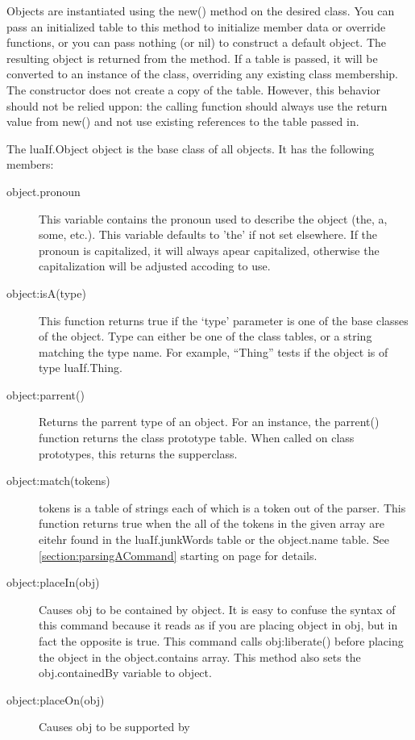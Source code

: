 \documentclass{book}
\begin{document}
Objects are instantiated using the new() method on the desired
class. You can pass an initialized table to this method to initialize
member data or override functions, or you can pass nothing (or nil) to
construct a default object. The resulting object is returned from the
method. If a table is passed, it will be converted to an instance of
the class, overriding any existing class membership. The constructor
does not create a copy of the table. However, this behavior should not
be relied uppon: the calling function should always use the return
value from new() and not use existing references to the table passed
in.

The luaIf.Object object is the base class of all objects. It has the
following members:

\begin{description}
\item[object.pronoun] This variable contains the pronoun used to
  describe the object (the, a, some, etc.). This variable defaults to
  'the' if not set elsewhere. If the pronoun is capitalized, it will
  always apear capitalized, otherwise the capitalization will be
  adjusted accoding to use.
\item[object:isA(type)] This function returns true if the `type'
  parameter is one of the base classes of the object. Type can either
  be one of the class tables, or a string matching the type name. For
  example, ``Thing'' tests if the object is of type luaIf.Thing.
\item[object:parrent()] Returns the parrent type of an object. For an
  instance, the parrent() function returns the class prototype
  table. When called on class prototypes, this returns the
  supperclass.
\item[object:match(tokens)] tokens is a table of strings each of which
  is a token out of the parser. This function returns true when the
  all of the tokens in the given array are eitehr found in the
  luaIf.junkWords table or the object.name table. See
  \ref{section:parsingACommand} starting on page
  \pageref{section:parsingACommand} for details.
\item[object:placeIn(obj)] Causes obj to be contained by
  object. It is easy to confuse the syntax of this command because it
  reads as if you are placing object in obj, but in fact the opposite
  is true. This command calls obj:liberate() before placing the object
  in the object.contains array. This method also sets the
  obj.containedBy variable to object.
\item[object:placeOn(obj)] Causes obj to be supported by

\end{description}
\end{document}
